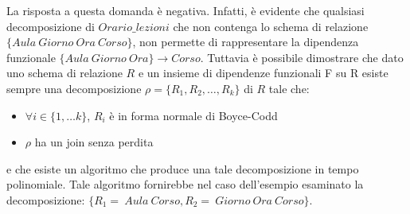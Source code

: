 La risposta a questa domanda è negativa. Infatti, è evidente che qualsiasi decomposizione di $Orario\_lezioni$ che non 
contenga lo schema di relazione $\{Aula\ Giorno\ Ora\ Corso\}$, non permette di rappresentare la dipendenza funzionale
$\{Aula\ Giorno\ Ora\} \rightarrow Corso$. Tuttavia è possibile dimostrare che dato uno schema di relazione $R$ e un 
insieme di dipendenze funzionali F su R esiste sempre una decomposizione $\rho=\{R_1, R_2, \ldots, R_k\}$ di $R$ tale 
che:
\begin{itemize}
 \item $\forall i \in \{1, \ldots k\}$, $R_i$ è in forma normale di Boyce-Codd
 \item $\rho$ ha un join senza perdita
\end{itemize}
e che esiste un algoritmo che produce una tale decomposizione in tempo polinomiale. Tale algoritmo fornirebbe nel caso 
dell'esempio esaminato la decomposizione: $\{R_1 =\ Aula\ Corso, R_2 =\ Giorno\ Ora\ Corso\}$.
